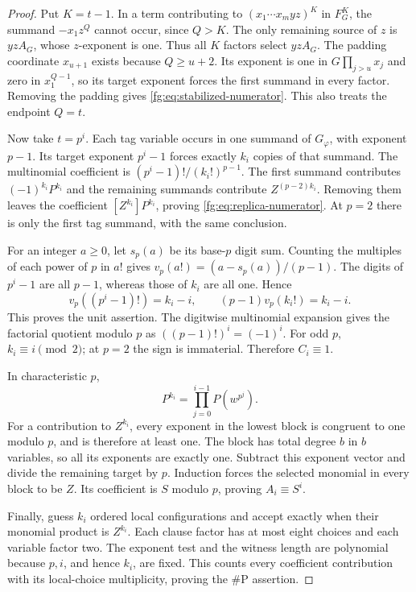 \begin{proof}
Put $K=t-1$. In a term contributing to
$(x_1\cdots x_myz)^K$ in $F_G^K$, the summand $-x_1z^Q$ cannot occur,
since $Q>K$. The only remaining source of $z$ is $yzA_G$, whose
$z$-exponent is one. Thus all $K$ factors select $yzA_G$. The padding
coordinate $x_{u+1}$ exists because $Q\ge u+2$. Its exponent is one in
$G\prod_{j>u}x_j$ and zero in $x_1^{Q-1}$, so its target exponent forces
the first summand in every factor. Removing the padding gives
\eqref{fg:eq:stabilized-numerator}. This also treats the endpoint $Q=t$.

Now take $t=p^i$. Each tag variable occurs in one summand of
$G_\varphi$, with exponent $p-1$. Its target exponent $p^i-1$ forces
exactly $k_i$ copies of that summand. The multinomial coefficient is
$(p^i-1)!/(k_i!)^{p-1}$. The first summand contributes
$(-1)^{k_i}P^{k_i}$ and the remaining summands contribute
$Z^{(p-2)k_i}$. Removing them leaves the coefficient
$[Z^{k_i}]P^{k_i}$, proving \eqref{fg:eq:replica-numerator}. At $p=2$
there is only the first tag summand, with the same conclusion.

For an integer $a\ge0$, let $s_p(a)$ be its base-$p$ digit sum. Counting
the multiples of each power of $p$ in $a!$ gives
$v_p(a!)=(a-s_p(a))/(p-1)$. The digits of $p^i-1$ are all $p-1$,
whereas those of $k_i$ are all one. Hence
\[
 v_p((p^i-1)!)=k_i-i,\qquad
 (p-1)v_p(k_i!)=k_i-i.
\]
This proves the unit assertion. The digitwise multinomial expansion
gives the factorial quotient modulo $p$ as
$((p-1)!)^i=(-1)^i$. For odd $p$, $k_i\equiv i\pmod2$; at $p=2$
the sign is immaterial. Therefore $C_i\equiv1$.

In characteristic $p$,
\[
 P^{k_i}=\prod_{j=0}^{i-1}P(w^{p^j}).
\]
For a contribution to $Z^{k_i}$, every exponent in the lowest block is
congruent to one modulo $p$, and is therefore at least one. The block
has total degree $b$ in $b$ variables, so all its exponents are exactly
one. Subtract this exponent vector and divide the remaining target by
$p$. Induction forces the selected monomial in every block to be $Z$.
Its coefficient is $S$ modulo $p$, proving $A_i\equiv S^i$.

Finally, guess $k_i$ ordered local configurations and accept exactly
when their monomial product is $Z^{k_i}$. Each clause factor has at most
eight choices and each variable factor two. The exponent test and the
witness length are polynomial because $p,i$, and hence $k_i$, are
fixed. This counts every coefficient contribution with its local-choice
multiplicity, proving the $\#\mathrm P$ assertion.
\end{proof}

